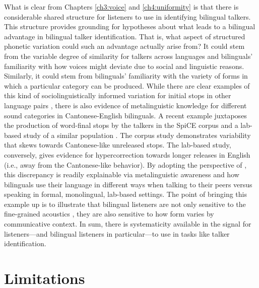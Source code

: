 What is clear from Chapters \ref{ch3:voice} and \ref{ch4:uniformity} is that there is considerable shared structure for listeners to use in identifying bilingual talkers. This structure provides grounding for hypotheses about what leads to a bilingual advantage in bilingual talker identification. That is, what aspect of structured phonetic variation could such an advantage actually arise from? It could stem from the variable degree of similarity for talkers across languages and bilinguals' familiarity with how voices might deviate due to social and linguistic reasons. Similarly, it could stem from bilinguals' familiarity with the variety of forms in which a particular category can be produced. While there are clear examples of this kind of sociolinguistically informed variation for initial stops in other language pairs \citep{bullock_2009_sociophonetics}, there is also evidence of metalinguistic knowledge for different sound categories in Cantonese-English bilinguals. A recent example juxtaposes the production of word-final stops by the talkers in the SpiCE corpus \citep{johnson_2021_language} and a lab-based study of a similar population \citep{polinsky_2018_heritage}. The corpus study demonstrates variability that skews towards Cantonese-like unreleased stops. The lab-based study, conversely, gives evidence for hypercorrection towards longer releases in English (i.e., away from the Cantonese-like behavior). By adopting the perspective of \citet{bullock_2009_sociophonetics}, this discrepancy is readily explainable via metalinguistic awareness and how bilinguals use their language in different ways when talking to their peers versus speaking in formal, monolingual, lab-based settings. The point of bringing this example up is to illustrate that bilingual listeners are not only sensitive to the fine-grained acoustics \citep{ju_2004_falling}, they are also sensitive to how form varies by communicative context. In sum, there is systematicity available in the signal for listeners---and bilingual listeners in particular---to use in tasks like talker identification. 

\section{Limitations}\label{ch5:sec:limitations}

